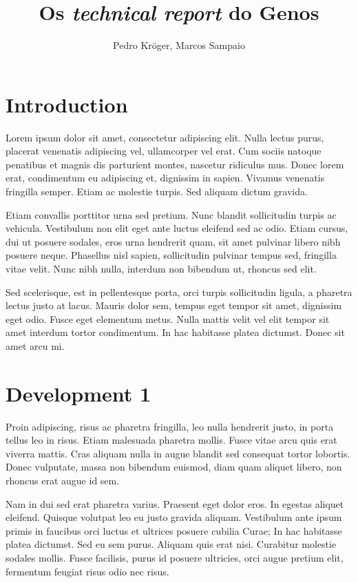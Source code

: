 \documentclass{genos-technical-report}
\title{Os \textit{technical report} do Genos}
\author{Pedro Kröger, Marcos Sampaio}
\begin{document}
\capa{}

\section{Introduction}
\label{sec:introduction}

Lorem ipsum dolor sit amet, consectetur adipiscing elit. Nulla lectus
purus, placerat venenatis adipiscing vel, ullamcorper vel erat. Cum
sociis natoque penatibus et magnis dis parturient montes, nascetur
ridiculus mus. Donec lorem erat, condimentum eu adipiscing et,
dignissim in sapien. Vivamus venenatis fringilla semper. Etiam ac
molestie turpis. Sed aliquam dictum gravida.

Etiam convallis porttitor urna sed pretium. Nunc blandit sollicitudin
turpis ac vehicula. Vestibulum non elit eget ante luctus eleifend sed
ac odio. Etiam cursus, dui ut posuere sodales, eros urna hendrerit
quam, sit amet pulvinar libero nibh posuere neque. Phasellus nisl
sapien, sollicitudin pulvinar tempus sed, fringilla vitae velit. Nunc
nibh nulla, interdum non bibendum ut, rhoncus sed elit.

Sed scelerisque, est in pellentesque porta, orci turpis sollicitudin
ligula, a pharetra lectus justo at lacus. Mauris dolor sem, tempus
eget tempor sit amet, dignissim eget odio. Fusce eget elementum
metus. Nulla mattis velit vel elit tempor sit amet interdum tortor
condimentum. In hac habitasse platea dictumst. Donec sit amet arcu mi.

\section{Development 1}
\label{sec:development-1}

Proin adipiscing, risus ac pharetra fringilla, leo nulla hendrerit
justo, in porta tellus leo in risus. Etiam malesuada pharetra
mollis. Fusce vitae arcu quis erat viverra mattis. Cras aliquam nulla
in augue blandit sed consequat tortor lobortis. Donec vulputate, massa
non bibendum euismod, diam quam aliquet libero, non rhoncus erat augue
id sem.

Nam in dui sed erat pharetra varius. Praesent eget dolor eros. In
egestas aliquet eleifend. Quisque volutpat leo eu justo gravida
aliquam. Vestibulum ante ipsum primis in faucibus orci luctus et
ultrices posuere cubilia Curae; In hac habitasse platea dictumst. Sed
eu sem purus. Aliquam quis erat nisi. Curabitur molestie sodales
mollis. Fusce facilisis, purus id posuere ultricies, orci augue
pretium elit, fermentum feugiat risus odio nec risus.
\end{document}
